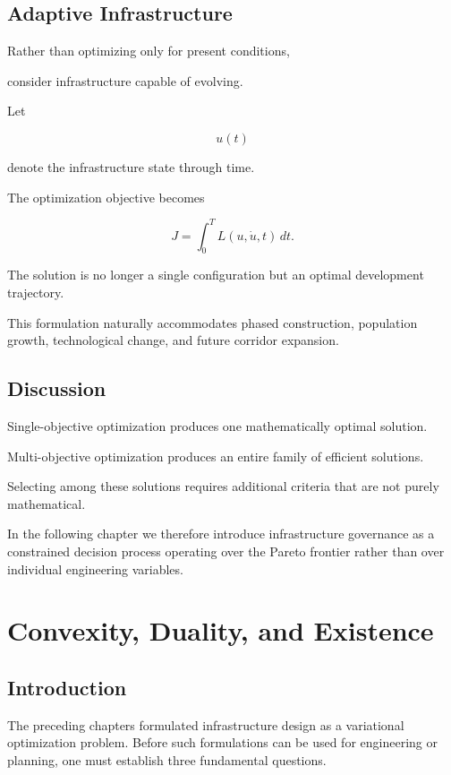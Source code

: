 \documentclass[11pt,fleqn]{book}
\numberwithin{equation}{chapter}
\theoremstyle{plain}
\theoremstyle{definition}
\theoremstyle{remark}
\begin{document}
\section{Adaptive Infrastructure}

Rather than optimizing only for present conditions,

consider infrastructure capable of evolving.

Let

\[
u(t)
\]

denote the infrastructure state through time.

The optimization objective becomes

\[
J
=
\int_0^T
L(u,\dot u,t)\,dt.
\]

The solution is no longer a single configuration but an optimal
development trajectory.

This formulation naturally accommodates phased construction, population
growth, technological change, and future corridor expansion.


\section{Discussion}

Single-objective optimization produces one mathematically optimal
solution.

Multi-objective optimization produces an entire family of efficient
solutions.

Selecting among these solutions requires additional criteria that are
not purely mathematical.

In the following chapter we therefore introduce infrastructure
governance as a constrained decision process operating over the Pareto
frontier rather than over individual engineering variables.

\chapter{Convexity, Duality, and Existence}

\section{Introduction}

The preceding chapters formulated infrastructure design as a
variational optimization problem. Before such formulations can be used
for engineering or planning, one must establish three fundamental
questions.
\end{document}
